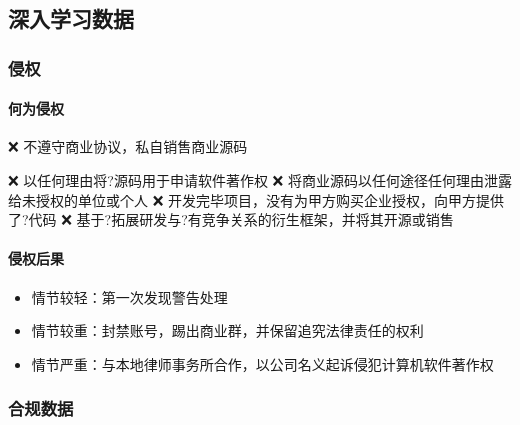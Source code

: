 \documentclass[letterpaper,11pt,english]{sphinxmanual}
\begin{document}
\subsection{深入学习数据}
\label{\detokenize{chapter_data_dive/index:chap-more}}\label{\detokenize{chapter_data_dive/index:id1}}\label{\detokenize{chapter_data_dive/index::doc}}

\subsubsection{侵权}
\label{\detokenize{chapter_data_dive/pirate:id1}}\label{\detokenize{chapter_data_dive/pirate::doc}}

\paragraph{何为侵权}
\label{\detokenize{chapter_data_dive/pirate:id2}}
❌
不遵守商业协议，私自销售商业源码%
\begin{footnote}[816]\sphinxAtStartFootnote
{}
%
\end{footnote}
❌ 以任何理由将?源码用于申请软件著作权 ❌
将商业源码以任何途径任何理由泄露给未授权的单位或个人 ❌
开发完毕项目，没有为甲方购买企业授权，向甲方提供了?代码 ❌
基于?拓展研发与?有竞争关系的衍生框架，并将其开源或销售


\paragraph{侵权后果}
\label{\detokenize{chapter_data_dive/pirate:id3}}\begin{itemize}
\item {} 
情节较轻：第一次发现警告处理

\item {} 
情节较重：封禁账号，踢出商业群，并保留追究法律责任的权利

\item {} 
情节严重：与本地律师事务所合作，以公司名义起诉侵犯计算机软件著作权

\end{itemize}


\subsubsection{合规数据}
\label{\detokenize{chapter_data_dive/compliance_data:id1}}\label{\detokenize{chapter_data_dive/compliance_data::doc}}
\end{document}
